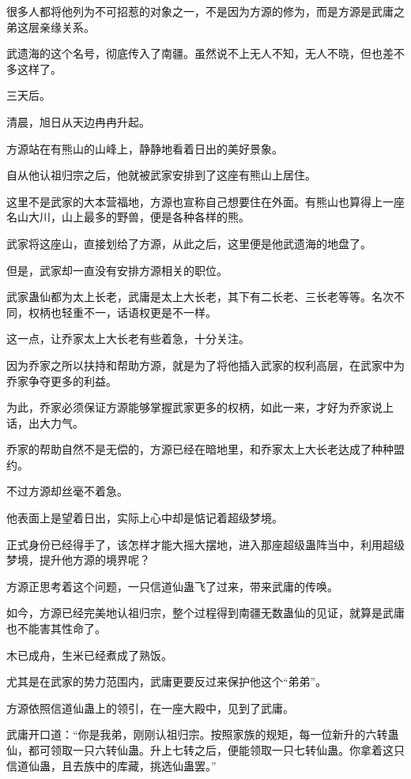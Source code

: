 \begin{this_body}
很多人都将他列为不可招惹的对象之一，不是因为方源的修为，而是方源是武庸之弟这层亲缘关系。

武遗海的这个名号，彻底传入了南疆。虽然说不上无人不知，无人不晓，但也差不多这样了。

三天后。

清晨，旭日从天边冉冉升起。

方源站在有熊山的山峰上，静静地看着日出的美好景象。

自从他认祖归宗之后，他就被武家安排到了这座有熊山上居住。

这里不是武家的大本营福地，方源也宣称自己想要住在外面。有熊山也算得上一座名山大川，山上最多的野兽，便是各种各样的熊。

武家将这座山，直接划给了方源，从此之后，这里便是他武遗海的地盘了。

但是，武家却一直没有安排方源相关的职位。

武家蛊仙都为太上长老，武庸是太上大长老，其下有二长老、三长老等等。名次不同，权柄也轻重不一，话语权更是不一样。

这一点，让乔家太上大长老有些着急，十分关注。

因为乔家之所以扶持和帮助方源，就是为了将他插入武家的权利高层，在武家中为乔家争夺更多的利益。

为此，乔家必须保证方源能够掌握武家更多的权柄，如此一来，才好为乔家说上话，出大力气。

乔家的帮助自然不是无偿的，方源已经在暗地里，和乔家太上大长老达成了种种盟约。

不过方源却丝毫不着急。

他表面上是望着日出，实际上心中却是惦记着超级梦境。

正式身份已经得手了，该怎样才能大摇大摆地，进入那座超级蛊阵当中，利用超级梦境，提升他方源的境界呢？

方源正思考着这个问题，一只信道仙蛊飞了过来，带来武庸的传唤。

如今，方源已经完美地认祖归宗，整个过程得到南疆无数蛊仙的见证，就算是武庸也不能害其性命了。

木已成舟，生米已经煮成了熟饭。

尤其是在武家的势力范围内，武庸更要反过来保护他这个“弟弟”。

方源依照信道仙蛊上的领引，在一座大殿中，见到了武庸。

武庸开口道：“你是我弟，刚刚认祖归宗。按照家族的规矩，每一位新升的六转蛊仙，都可领取一只六转仙蛊。升上七转之后，便能领取一只七转仙蛊。你拿着这只信道仙蛊，且去族中的库藏，挑选仙蛊罢。”

\end{this_body}

